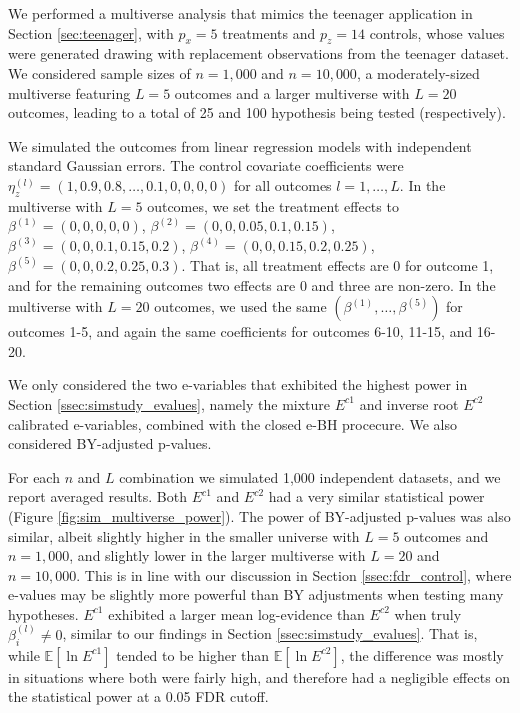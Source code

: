\documentclass[pdflatex,sn-mathphys-num]{sn-jnl}%
\theoremstyle{thmstyleone}%
\theoremstyle{thmstyletwo}%
\theoremstyle{thmstylethree}%
\begin{document}
We performed a multiverse analysis that mimics the teenager application in Section \ref{sec:teenager}, with $p_x=5$ treatments and $p_z=14$ controls, whose values were generated drawing with replacement observations from the teenager dataset.
We considered sample sizes of $n= 1,000$ and $n=10,000$,
a moderately-sized multiverse featuring $L=5$ outcomes and a larger multiverse with $L=20$ outcomes, leading to a total of 25 and 100 hypothesis being tested (respectively).

We simulated the outcomes from linear regression models with independent standard Gaussian errors. The control covariate coefficients were $\eta_z^{(l)}= (1, 0.9, 0.8, \ldots, 0.1, 0, 0, 0, 0)$ for all outcomes $l=1,\ldots,L$. In the multiverse with $L=5$ outcomes, we set the treatment effects to
$\beta^{(1)}= (0, 0, 0, 0, 0)$, 
$\beta^{(2)}= (0, 0, 0.05, 0.1, 0.15)$,
$\beta^{(3)} = (0, 0, 0.1, 0.15, 0.2)$,
$\beta^{(4)} = (0, 0, 0.15, 0.2, 0.25)$,
$\beta^{(5)} = (0, 0, 0.2, 0.25, 0.3)$.
That is, all treatment effects are 0 for outcome 1, and for the remaining outcomes two effects are 0 and three are non-zero.
In the multiverse with $L=20$ outcomes, we used the same $(\beta^{(1)},\ldots,\beta^{(5)})$ for outcomes 1-5, and again the same coefficients for outcomes 6-10, 11-15, and 16-20. 

We only considered the two e-variables that exhibited the highest power in Section \ref{ssec:simstudy_evalues}, namely the mixture $E^{c1}$ and inverse root $E^{c2}$ calibrated e-variables, combined with the closed e-BH procecure. We also considered BY-adjusted p-values.

For each $n$ and $L$ combination we simulated 1,000 independent datasets, and we report averaged results.
Both $E^{c1}$ and $E^{c2}$ had a very similar statistical power (Figure \ref{fig:sim_multiverse_power}).
The power of BY-adjusted p-values was also similar, albeit slightly higher in the smaller universe with $L=5$ outcomes and $n=1,000$, and slightly lower in the larger multiverse with $L=20$ and $n=10,000$.
This is in line with our discussion in Section \ref{ssec:fdr_control}, where e-values may be slightly more powerful than BY adjustments when testing many hypotheses.
$E^{c1}$ exhibited a larger mean log-evidence than $E^{c2}$ when truly $\beta_i^{(l)} \neq 0$, similar to our findings in Section \ref{ssec:simstudy_evalues}.
That is, while $\mathbb E [\ln E^{c1}]$ tended to be higher than $\mathbb E[ \ln E^{c2}]$, the difference was mostly in situations where both were fairly high, and therefore had a negligible effects on the statistical power at a 0.05 FDR cutoff.
\end{document}
